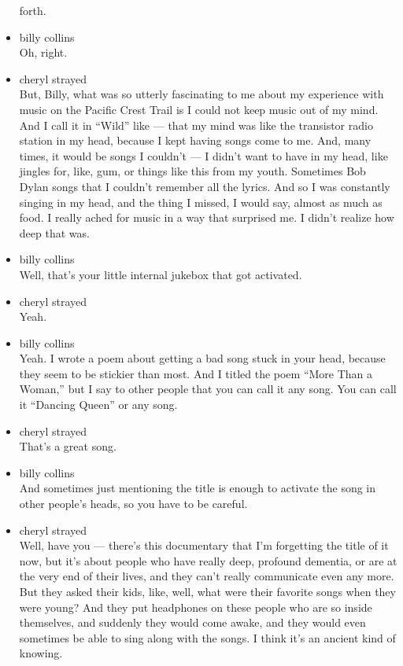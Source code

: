 \begin{itemize}
  forth.
\item
  billy collins\\
  Oh, right.
\item
  cheryl strayed\\
  But, Billy, what was so utterly fascinating to me about my experience
  with music on the Pacific Crest Trail is I could not keep music out of
  my mind. And I call it in ``Wild'' like --- that my mind was like the
  transistor radio station in my head, because I kept having songs come
  to me. And, many times, it would be songs I couldn't --- I didn't want
  to have in my head, like jingles for, like, gum, or things like this
  from my youth. Sometimes Bob Dylan songs that I couldn't remember all
  the lyrics. And so I was constantly singing in my head, and the thing
  I missed, I would say, almost as much as food. I really ached for
  music in a way that surprised me. I didn't realize how deep that was.
\item
  billy collins\\
  Well, that's your little internal jukebox that got activated.
\item
  cheryl strayed\\
  Yeah.
\item
  billy collins\\
  Yeah. I wrote a poem about getting a bad song stuck in your head,
  because they seem to be stickier than most. And I titled the poem
  ``More Than a Woman,'' but I say to other people that you can call it
  any song. You can call it ``Dancing Queen'' or any song.
\item
  cheryl strayed\\
  That's a great song.
\item
  billy collins\\
  And sometimes just mentioning the title is enough to activate the song
  in other people's heads, so you have to be careful.
\item
  cheryl strayed\\
  Well, have you --- there's this documentary that I'm forgetting the
  title of it now, but it's about people who have really deep, profound
  dementia, or are at the very end of their lives, and they can't really
  communicate even any more. But they asked their kids, like, well, what
  were their favorite songs when they were young? And they put
  headphones on these people who are so inside themselves, and suddenly
  they would come awake, and they would even sometimes be able to sing
  along with the songs. I think it's an ancient kind of knowing.

\end{itemize}

